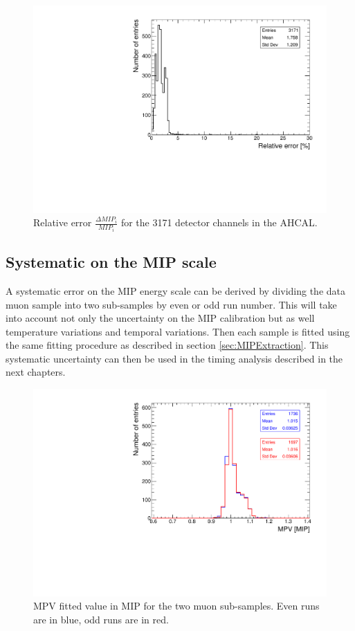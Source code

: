 \begin{figure}[htbp!]
	\centering
	\includegraphics[width=0.6\linewidth]{../Thesis_Plots/EnergyCalib/Plots/RelativeErrorMIP_Combined.pdf}
	\caption{Relative error $\frac{\Delta MIP_i}{MIP_i}$ for the 3171 detector channels in the AHCAL.} \label{fig:MIPError}
\end{figure}

\subsection{Systematic on the MIP scale}

A systematic error on the MIP energy scale can be derived by dividing the data muon sample into two sub-samples by even or odd run number. This will take into account not only the uncertainty on the MIP calibration but as well temperature variations and temporal variations. Then each sample is fitted using the same fitting procedure as described in section \ref{sec:MIPExtraction}. This systematic uncertainty can then be used in the timing analysis described in the next chapters.

\begin{figure}[htbp!]
	\centering
	\includegraphics[width=0.7\linewidth]{../Thesis_Plots/EnergyCalib/Plots/SystematicMIP.pdf}
	\caption{MPV fitted value in MIP for the two muon sub-samples. Even runs are in blue, odd runs are in red.} \label{fig:MIPSyst}
\end{figure}

